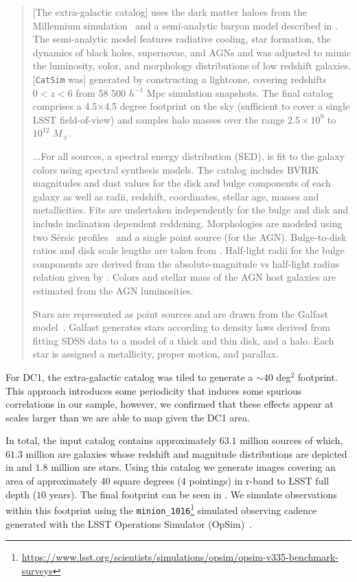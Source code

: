 \documentclass[\docopts]{\docclass}
\begin{document}
\begin{quote}
[The extra-galactic catalog] uses the dark matter haloes from the Millennium simulation~\citep{2005Nature.435.629S} and a semi-analytic baryon model described in \citet{2006MNRAS.366..499D}. The semi-analytic model features radiative cooling, star formation, the dynamics of black holes, supernovae, and AGNs and was adjusted to mimic the luminosity, color, and morphology distributions of low redshift galaxies.  [\texttt{CatSim} was] generated by constructing a lightcone, covering redshifts $0<z<6$ from 58 500 $h^{-1}$ Mpc simulation snapshots. The final catalog comprises a 4.5$\times$4.5 degree footprint on the sky (sufficient to cover a single LSST field-of-view) and samples halo masses over the range $2.5\times10^{9}$ to $10^{12}$ $M_{\sun}$.

...For all sources, a spectral energy distribution (SED), is fit to the galaxy colors using \citet{2003MNRAS.344.1000B} spectral synthesis models. The \citet{2006MNRAS.366..499D} catalog includes BVRIK magnitudes and dust values for the disk and bulge components of each galaxy as well as radii, redshift, coordinates, stellar age, masses and metallicities. Fits are undertaken independently for the bulge and disk and include inclination dependent reddening. Morphologies are modeled using two S\'{e}rsic profiles~\citep{1963BAAA....6...41S} and a single point source (for the AGN). Bulge-to-disk ratios and disk scale lengths are taken from \citep{2006MNRAS.366..499D}. Half-light radii for the bulge components are derived from the absolute-magnitude vs half-light radius relation given by \citet{2011A&A...534A...3G}. Colors and stellar mass of the AGN host galaxies are estimated from the AGN luminosities.

Stars are represented as point sources and are drawn from the Galfast model~\citep{2008ApJ...673..864J}. Galfast generates stars according to density laws derived from fitting SDSS data to a model of a thick and thin disk, and a halo. Each star is assigned a metallicity, proper motion, and parallax. 
\end{quote}

For DC1, the extra-galactic catalog was tiled to generate a $\sim 40$ deg$^{2}$ footprint. This approach introduces some periodicity that induces some spurious correlations in our sample, however, we confirmed that these effects appear at scales larger than we are able to map given the DC1 area.

In total, the input catalog contains approximately $63.1$ million sources of which, $61.3$ million are galaxies whose redshift and magnitude distributions are depicted in  and $1.8$ million are stars. Using this catalog we generate images covering an area of approximately $40$ square degrees ($4$ pointings) in r-band to LSST full depth ($10$ years). The final footprint can be seen in .  We simulate observations within this footprint using the \texttt{minion\_1016}\footnote{\url{https://www.lsst.org/scientists/simulations/opsim/opsim-v335-benchmark-surveys}} simulated observing cadence generated with the LSST Operations Simulator (OpSim)~\citep{2014SPIE.9150E..15D}.
\end{document}
